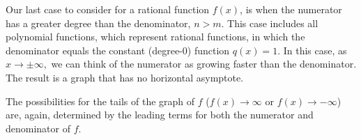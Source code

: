 \documentclass[12pt]{book}
\theoremstyle{definition}
\begin{document}
Our last case to consider for a rational function $f(x)$, is when the numerator has a greater degree than the denominator, $n>m$.  This case includes all polynomial functions, which represent rational functions, in which the denominator equals the constant (degree-0) function $q(x)=1$.  In this case, as $x\rightarrow\pm\infty,$ we can think of the numerator as growing faster than the denominator.  The result is a graph that has no horizontal asymptote.
\begin{center}
\end{center}
The possibilities for the tails of the graph of $f$ ($f(x)\rightarrow\infty$ or $f(x)\rightarrow-\infty$) are, again, determined by the leading terms for both the numerator and denominator of $f$.
\end{document}
